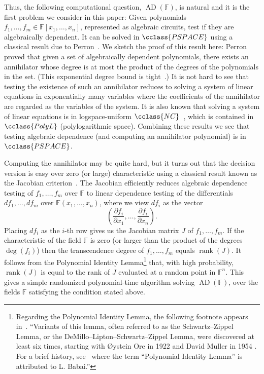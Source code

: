 \documentclass{toc}
\newcommand{\F}{\mathbb{F}}
\DeclareMathOperator{\rk}{\mathrm{rank}}
\newcommand{\PSPACE}{\cclass{PSPACE}\xspace}  %
\newcommand{\NC}{\cclass{NC}\xspace}  %
\newcommand{\PolyL}{\cclass{PolyL}\xspace}  %
\DeclareMathOperator{\AD}{\mathrm{AD}\xspace} %
\begin{document}
%
%

Thus, the following computational question, %
%
%
$\AD(\F)$,   %
is natural and it is the first problem we consider in this paper: 
Given polynomials
%
%
$f_1,\ldots ,f_m \in \F[x_1, \ldots ,x_n]$,  %
represented as algebraic circuits, %
test if they are algebraically dependent. 
It can be solved in $\PSPACE$ using a classical result due to
Perron~\cite{Per27,Plo05}. 
We sketch the proof of this result here:
Perron proved that given a set of algebraically dependent polynomials, there exists an annihilator whose degree is
%
at most  %
the product of the degrees of the polynomials in the
%
set. (This exponential degree bound is tight~\cite{Kay09}.) %
It is not hard to see that testing the existence of such an annihilator reduces to solving a
%
system of linear equations in exponentially many variables %
where the coefficients of the annihilator are regarded as the
variables of the system.
It is also  known that solving a
%
%
%
system of linear equations %
is in logspace-uniform 
%
%
$\NC$~\cite{C76, BGH82, Mul87}, %
which is contained in $\PolyL$ (polylogarithmic space). %
%
%
Combining these results  %
we see that testing algebraic dependence
(and computing an annihilator polynomial) is in $\PSPACE$.
 
Computing the annihilator may be quite hard, but it turns out that the decision version is easy over zero (or large) characteristic using a classical result known as the Jacobian criterion~\cite{Jac41, BMS13}. The Jacobian efficiently reduces algebraic dependence testing of $f_1,\ldots,f_m$ over $\F$ to linear dependence testing of the differentials $df_1,\ldots,df_m$ over $\F(x_1,\ldots,x_n)$, where we view $df_i$ as the vector
\[
  \left( \frac{\partial f_i} {\partial x_1},\ldots, \frac{\partial f_i} {\partial x_n}\right).
\]
Placing $df_i$ as the $i$-th row gives us the Jacobian matrix $J$ of
$f_1,\ldots,f_m$. If the characteristic of the field $\F$ is zero (or
larger than the product of the degrees $\deg(f_i)$) then the
transcendence degree of $f_1,\dots,f_m$ equals $\rk(J)$.  It follows
from the
%
Polynomial Identity Lemma\footnote{Regarding the Polynomial Identity
Lemma, the following footnote appears in~\cite{CKS}. ``Variants of this
lemma, often referred to as the Schwartz--Zippel Lemma, or the
DeMillo--Lipton--Schwartz--Zippel Lemma,
were discovered at least six times, starting with
{\O}ystein Ore in 1922 and David Muller in 1954
\cite{ore,muller,schmidt,demillo1978probabilistic,zippel1979probabilistic,Sch80}.
For a brief history, see~\cite{arvind}
where the term ``Polynomial Identity Lemma''
is attributed to L. Babai.''}
that, with high probability, $\rk(J)$ is equal to the rank of $J$ evaluated at a random point in $\F^n$. This gives a simple randomized
%
polynomial-time   %
algorithm solving
%
$\AD(\F)$,   %
%
over the fields $\F$ satisfying the condition stated above.   %
\end{document}
